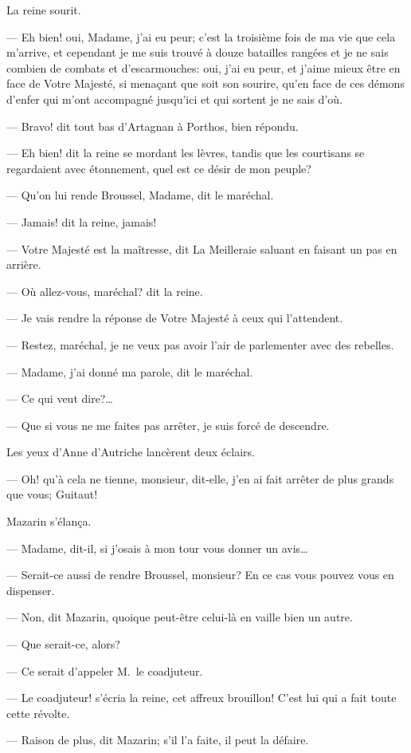 La reine sourit.

— Eh bien! oui, Madame, j'ai eu peur; c'est la troisième fois de ma vie que cela m'arrive, et cependant je me suis trouvé à douze batailles rangées et je ne sais combien de combats et d'escarmouches: oui, j'ai eu peur, et j'aime mieux être en face de Votre Majesté, si menaçant que soit son sourire, qu'en face de ces démons d'enfer qui m'ont accompagné jusqu'ici et qui sortent je ne sais d'où.

— Bravo! dit tout bas d'Artagnan à Porthos, bien répondu.

— Eh bien! dit la reine se mordant les lèvres, tandis que les courtisans se regardaient avec étonnement, quel est ce désir de mon peuple?

— Qu'on lui rende Broussel, Madame, dit le maréchal.

— Jamais! dit la reine, jamais!

— Votre Majesté est la maîtresse, dit La Meilleraie saluant en faisant un pas en arrière.

— Où allez-vous, maréchal? dit la reine.

— Je vais rendre la réponse de Votre Majesté à ceux qui l'attendent.

— Restez, maréchal, je ne veux pas avoir l'air de parlementer avec des rebelles.

— Madame, j'ai donné ma parole, dit le maréchal.

— Ce qui veut dire?\dots

— Que si vous ne me faites pas arrêter, je suis forcé de descendre.

Les yeux d'Anne d'Autriche lancèrent deux éclairs.

— Oh! qu'à cela ne tienne, monsieur, dit-elle, j'en ai fait arrêter de plus grands que vous; Guitaut!

Mazarin s'élança.

— Madame, dit-il, si j'osais à mon tour vous donner un avis\dots

— Serait-ce aussi de rendre Broussel, monsieur? En ce cas vous pouvez vous en dispenser.

— Non, dit Mazarin, quoique peut-être celui-là en vaille bien un autre.

— Que serait-ce, alors?

— Ce serait d'appeler M.~le coadjuteur.

— Le coadjuteur! s'écria la reine, cet affreux brouillon! C'est lui qui a fait toute cette révolte.

— Raison de plus, dit Mazarin; s'il l'a faite, il peut la défaire.

